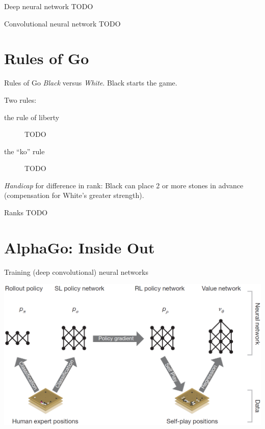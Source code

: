 \documentclass{beamer}
\newcommand{\todo}{\alert{TODO}}
\begin{document}
  \begin{frame}{Deep neural network}
    \todo
  \end{frame}

  \begin{frame}{Convolutional neural network}
    \todo
  \end{frame}


  \section{Rules of Go}
  \begin{frame}{Rules of Go}
    \emph{Black} versus \emph{White}.
    Black starts the game.

    \pause
    Two rules:
    \begin{description}
      \item [the rule of liberty] \todo
      \item [the ``ko'' rule] \todo
    \end{description}

    \pause
    \emph{Handicap} for difference in rank:
    Black can place 2 or more stones in advance (compensation for White's greater strength).
  \end{frame}

  \begin{frame}{Ranks}
    \todo
  \end{frame}


  \section{AlphaGo: Inside Out}
  \begin{frame}{Training (deep convolutional) neural networks}
    \begin{center}
      \includegraphics[width=\textwidth]{../img/neural_nets_pipeline.png}
    \end{center}
  \end{frame}
\end{document}
